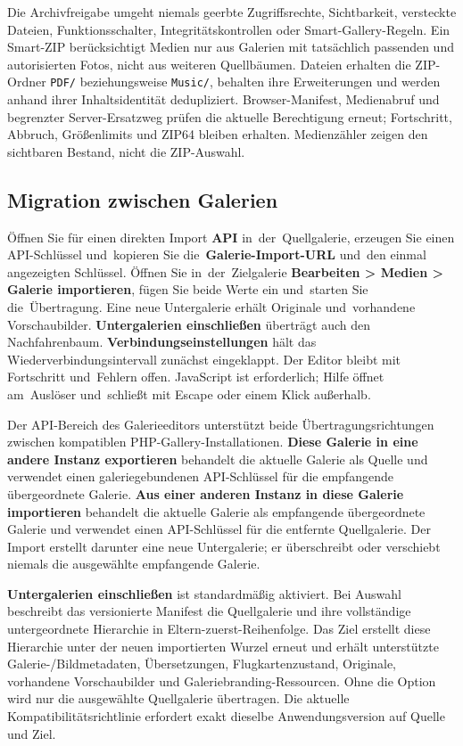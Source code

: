 \documentclass[11pt,a4paper]{article}
\newcommand{\ui}[1]{\textbf{#1}}
\begin{document}
Die Archivfreigabe umgeht niemals geerbte Zugriffsrechte, Sichtbarkeit,
versteckte Dateien, Funktionsschalter, Integritätskontrollen oder
Smart-Gallery-Regeln. Ein Smart-ZIP berücksichtigt Medien nur aus Galerien mit
tatsächlich passenden und autorisierten Fotos, nicht aus weiteren Quellbäumen.
Dateien erhalten die ZIP-Ordner \texttt{PDF/} beziehungsweise \texttt{Music/},
behalten ihre Erweiterungen und werden anhand ihrer Inhaltsidentität
dedupliziert. Browser-Manifest, Medienabruf und begrenzter Server-Ersatzweg
prüfen die aktuelle Berechtigung erneut; Fortschritt, Abbruch, Größenlimits und
ZIP64 bleiben erhalten. Medienzähler zeigen den sichtbaren Bestand, nicht die
ZIP-Auswahl.

\subsection{Migration zwischen Galerien}

Öffnen Sie für einen direkten Import \ui{API} in~der~Quellgalerie,
erzeugen Sie einen API-Schlüssel und~kopieren Sie die~\ui{Galerie-Import-URL}
und~den einmal angezeigten Schlüssel. Öffnen Sie in~der~Zielgalerie
\ui{Bearbeiten > Medien > Galerie importieren}, fügen Sie beide Werte ein
und~starten Sie die~Übertragung. Eine neue Untergalerie erhält Originale
und~vorhandene Vorschaubilder. \ui{Untergalerien einschließen} überträgt
auch den Nachfahrenbaum. \ui{Verbindungseinstellungen} hält das
Wiederverbindungsintervall zunächst eingeklappt. Der Editor bleibt mit
Fortschritt und~Fehlern offen. JavaScript ist erforderlich; Hilfe öffnet
am~Auslöser und~schließt mit Escape oder einem Klick außerhalb.

Der API-Bereich des Galerieeditors unterstützt beide Übertragungsrichtungen
zwischen kompatiblen PHP-Gallery-Installationen. \ui{Diese Galerie in eine
andere Instanz exportieren} behandelt die aktuelle Galerie als Quelle und
verwendet einen galeriegebundenen API-Schlüssel für die empfangende
übergeordnete Galerie. \ui{Aus einer anderen Instanz in diese Galerie
importieren} behandelt die aktuelle Galerie als empfangende übergeordnete
Galerie und verwendet einen API-Schlüssel für die entfernte Quellgalerie. Der
Import erstellt darunter eine neue Untergalerie; er überschreibt oder verschiebt
niemals die ausgewählte empfangende Galerie.

\ui{Untergalerien einschließen} ist standardmäßig aktiviert. Bei Auswahl
beschreibt das versionierte Manifest die Quellgalerie und ihre vollständige
untergeordnete Hierarchie in Eltern-zuerst-Reihenfolge. Das Ziel erstellt diese
Hierarchie unter der neuen importierten Wurzel erneut und erhält unterstützte
Galerie-/Bildmetadaten, Übersetzungen, Flugkartenzustand, Originale, vorhandene
Vorschaubilder und Galeriebranding-Ressourcen. Ohne die Option wird nur die
ausgewählte Quellgalerie übertragen. Die aktuelle Kompatibilitätsrichtlinie
erfordert exakt dieselbe Anwendungsversion auf Quelle und Ziel.
\end{document}
